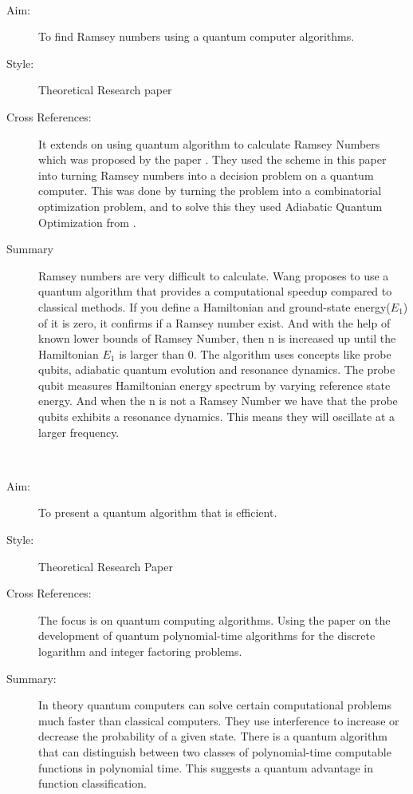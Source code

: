 \documentclass{Assignment}
\begin{document}
	\newpage
\cite{PhysRevA.93.032301}~
\begin{description}
	\item [Aim:]
	To find Ramsey numbers using a quantum computer algorithms.
	\item [Style:]
	Theoretical Research paper
	\item [Cross References:]
	It  extends on using quantum algorithm to calculate Ramsey Numbers which was proposed by the paper \cite{gaitan2012ramsey}.
	They used the scheme in this paper into turning Ramsey numbers into a decision problem on a quantum computer.
	This was done by turning the problem into a combinatorial optimization problem, and to solve this they used Adiabatic Quantum Optimization from \cite{farhi2000quantum}.
	
	\item [Summary]
	Ramsey numbers are very difficult to calculate.
	Wang proposes to use a quantum algorithm that provides a computational speedup compared to classical methods.
	If you define a Hamiltonian and ground-state energy($E_1$) of it is zero, it confirms if a Ramsey number exist. 
	And with the help of known lower bounds of Ramsey Number, then n is increased up until the Hamiltonian $E_1$ is larger than 0.
	The algorithm uses concepts like probe qubits, adiabatic quantum evolution and resonance dynamics. 
	The probe qubit measures Hamiltonian energy spectrum by varying reference state energy. 
	And when the n is not a Ramsey Number we have that the probe qubits exhibits a resonance dynamics.
	This means they will oscillate at a larger frequency.
\end{description}


\newpage
\cite{doi:10.1137/S0097539796298637}~
\begin{description}
	\item[Aim:]
	To present a quantum algorithm that is efficient.
	
	\item [Style:]
	Theoretical Research Paper
	\item [Cross References:]
	The focus is on quantum computing algorithms.
	Using the paper \cite{shor1994algorithms} on the development of quantum polynomial-time algorithms for the discrete logarithm and integer factoring problems.
	
	
	\item[Summary:]
	 In theory quantum computers can solve certain computational problems much faster than classical computers.
	They use interference to increase or decrease the probability of a given state.
	There is a quantum algorithm that can distinguish between two classes of polynomial-time computable functions in polynomial time. 
	This suggests a quantum advantage in function classification. 
\end{description}
\end{document}
